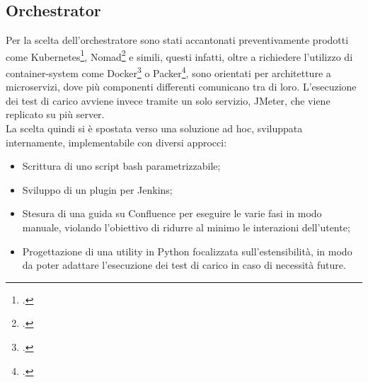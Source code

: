 \subsection{Orchestrator}
Per la scelta dell'orchestratore sono stati accantonati preventivamente prodotti come Kubernetes\footcite{site:kubernetes}, Nomad\footcite{site:nomad} e simili, questi infatti, oltre a richiedere l'utilizzo di \gls{container-system} come Docker\footcite{site:docker} o Packer\footcite{site:packer}, sono orientati per architetture a 	\gls{microservizi}, dove più componenti differenti comunicano tra di loro. L'esecuzione dei test di carico avviene invece tramite un solo servizio, JMeter, che viene replicato su più server. \\
La scelta quindi si è spostata verso una soluzione ad hoc, sviluppata internamente, implementabile con diversi approcci:
\begin{itemize}
	\item Scrittura di uno script bash parametrizzabile;
	\item Sviluppo di un \gls{plugin} per Jenkins;
	\item Stesura di una guida su Confluence per eseguire le varie fasi in modo manuale, violando l'obiettivo di ridurre al minimo le interazioni dell'utente;
	\item Progettazione di una utility in Python focalizzata sull'estensibilità, in modo da poter adattare l'esecuzione dei test di carico in caso di necessità future.
\end{itemize}
